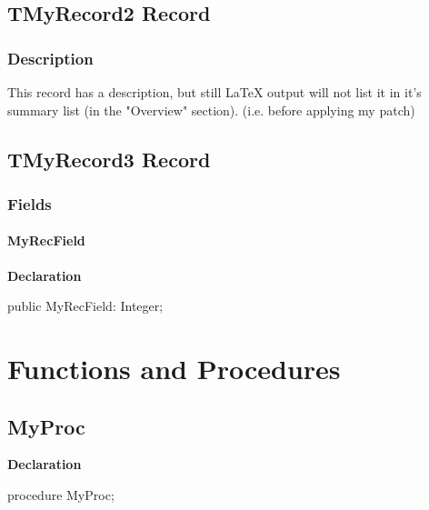 \documentclass{report}
\begin{document}
\subsection*{TMyRecord2 Record}
\subsubsection*{\large{\textbf{Description}}\normalsize\hspace{1ex}\hfill}
This record has a description, but still LaTeX output will not list it in it's summary list (in the "Overview" section). (i.e. before applying my patch)\subsection*{TMyRecord3 Record}
\subsubsection*{\large{\textbf{Fields}}\normalsize\hspace{1ex}\hfill}
\paragraph*{MyRecField}\hspace*{\fill}

\begin{list}{}{
\setlength{\itemindent}{0cm}
\setlength{\listparindent}{0cm}
\setlength{\leftmargin}{\evensidemargin}
\addtolength{\leftmargin}{\tmplength}
\settowidth{\labelsep}{X}
\addtolength{\leftmargin}{\labelsep}
\setlength{\labelwidth}{\tmplength}
}
\begin{flushleft}
\item[\textbf{Declaration}\hfill]
\begin{ttfamily}
public MyRecField: Integer;\end{ttfamily}


\end{flushleft}
\end{list}
\section{Functions and Procedures}
\subsection*{MyProc}
\begin{list}{}{
\setlength{\itemindent}{0cm}
\setlength{\listparindent}{0cm}
\setlength{\leftmargin}{\evensidemargin}
\addtolength{\leftmargin}{\tmplength}
\settowidth{\labelsep}{X}
\addtolength{\leftmargin}{\labelsep}
\setlength{\labelwidth}{\tmplength}
}
\begin{flushleft}
\item[\textbf{Declaration}\hfill]
\begin{ttfamily}
procedure MyProc;\end{ttfamily}


\end{flushleft}
\end{list}
\end{document}

